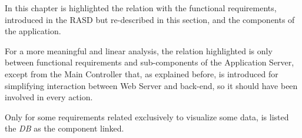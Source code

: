 In this chapter is highlighted the relation with the functional requirements, introduced in the RASD but re-described in this section, and the components of the application.

For a more meaningful and linear analysis, the relation highlighted is only between functional requirements and sub-components of the Application Server, except from the Main Controller that, as explained before, is introduced for simplifying interaction between Web Server and back-end, so it should have been involved in every action.

Only for some requirements related exclusively to visualize some data, is listed the \textit{DB} as the component linked.

\vspace{1cm}

\setcounter{req}{1}
\newcommand{\creq}{\thereq\stepcounter{req}}
